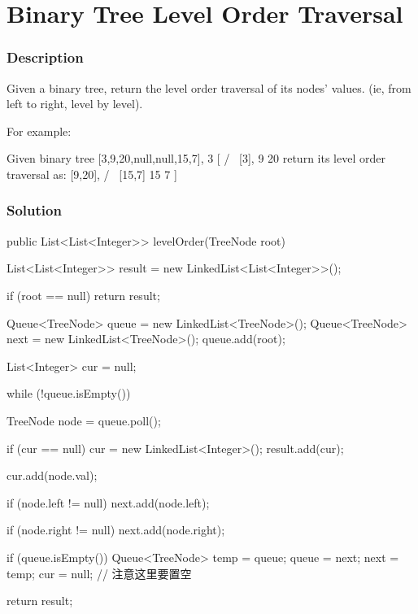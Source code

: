 \newpage

\section{Binary Tree Level Order Traversal} %

\subsubsection{Description}
Given a binary tree, return the level order traversal of its nodes' values. (ie, from left to right, level by level).

For example:
\begin{Code}
Given binary tree [3,9,20,null,null,15,7],
    3                                                [
   / \                                                  [3],
  9  20      return its level order traversal as:       [9,20],
    /  \                                                [15,7]
   15   7                                            ]
\end{Code}

\subsubsection{Solution}

\begin{Code}
public List<List<Integer>> levelOrder(TreeNode root) {
    List<List<Integer>> result = new LinkedList<List<Integer>>();

    if (root == null) {
        return result;
    }

    Queue<TreeNode> queue = new LinkedList<TreeNode>();
    Queue<TreeNode> next = new LinkedList<TreeNode>();
    queue.add(root);

    List<Integer> cur = null;

    while (!queue.isEmpty()) {
        TreeNode node = queue.poll();

        if (cur == null) {
            cur = new LinkedList<Integer>();
            result.add(cur);
        }

        cur.add(node.val);

        if (node.left != null) {
            next.add(node.left);
        }

        if (node.right != null) {
            next.add(node.right);
        }

        if (queue.isEmpty()) {
            Queue<TreeNode> temp = queue;
            queue = next;
            next = temp;
            cur = null; // 注意这里要置空
        }
    }

    return result;
}
\end{Code}

